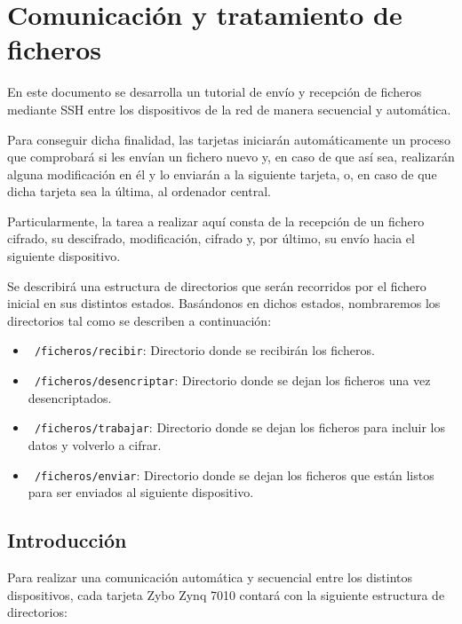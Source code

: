 \section{Comunicación y tratamiento de ficheros}
En este documento se desarrolla un tutorial de envío y recepción de ficheros mediante SSH entre los dispositivos de la red de manera secuencial y automática.

Para conseguir dicha finalidad, las tarjetas iniciarán automáticamente un proceso que comprobará si les envían un fichero nuevo y, en caso de que así sea, realizarán alguna modificación en él y lo enviarán a la siguiente tarjeta, o, en caso de que dicha tarjeta sea la última, al ordenador central.

Particularmente, la tarea a realizar aquí consta de la recepción de un fichero cifrado, su descifrado, modificación, cifrado y, por último, su envío hacia el siguiente dispositivo.

Se describirá una estructura de directorios que serán recorridos por el fichero inicial en sus distintos estados. Basándonos en dichos estados, nombraremos los directorios tal como se describen a continuación:

\begin{itemize}
	\item \texttt{~/ficheros/recibir}: Directorio donde se recibirán los ficheros.
	\item \texttt{~/ficheros/desencriptar}: Directorio donde se dejan los ficheros una vez desencriptados.
	\item \texttt{~/ficheros/trabajar}: Directorio donde se dejan los ficheros para incluir los datos y volverlo a cifrar.
	\item \texttt{~/ficheros/enviar}: Directorio donde se dejan los ficheros que están listos para ser enviados al siguiente dispositivo.
\end{itemize}

\subsection{Introducción}
Para realizar una comunicación automática y secuencial entre los distintos dispositivos, cada tarjeta Zybo Zynq 7010 contará con la siguiente estructura de directorios:\\

